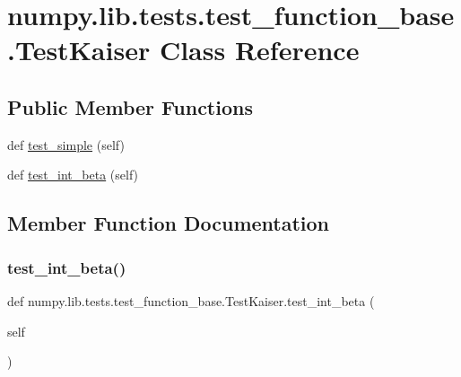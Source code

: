 \hypertarget{classnumpy_1_1lib_1_1tests_1_1test__function__base_1_1TestKaiser}{}\section{numpy.\+lib.\+tests.\+test\+\_\+function\+\_\+base.\+Test\+Kaiser Class Reference}
\label{classnumpy_1_1lib_1_1tests_1_1test__function__base_1_1TestKaiser}
\subsection*{Public Member Functions}
\begin{DoxyCompactItemize}
\item 
def \hyperlink{classnumpy_1_1lib_1_1tests_1_1test__function__base_1_1TestKaiser_ada37f565af97797109d26575174a13e9}{test\+\_\+simple} (self)
\item 
def \hyperlink{classnumpy_1_1lib_1_1tests_1_1test__function__base_1_1TestKaiser_ae810d712a912b0dbd54244c4d7ad4a9c}{test\+\_\+int\+\_\+beta} (self)
\end{DoxyCompactItemize}


\subsection{Member Function Documentation}
\mbox{\label{classnumpy_1_1lib_1_1tests_1_1test__function__base_1_1TestKaiser_ae810d712a912b0dbd54244c4d7ad4a9c}} 
\subsubsection{\texorpdfstring{test\+\_\+int\+\_\+beta()}{test\_int\_beta()}}
{\footnotesize\ttfamily def numpy.\+lib.\+tests.\+test\+\_\+function\+\_\+base.\+Test\+Kaiser.\+test\+\_\+int\+\_\+beta (\begin{DoxyParamCaption}\item[{}]{self }\end{DoxyParamCaption})}

